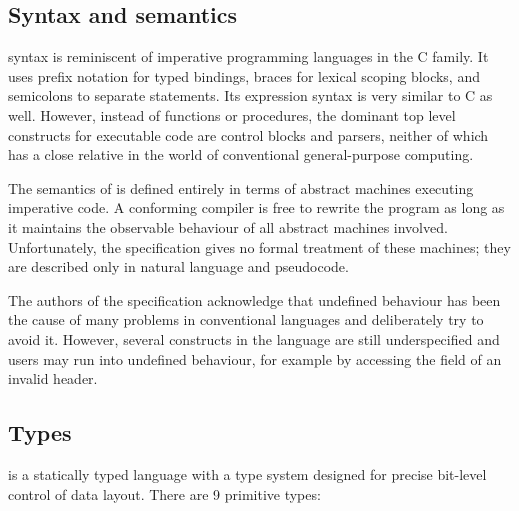 \subsection{Syntax and semantics}



\pfs syntax is reminiscent of imperative programming languages in the C family.
It uses prefix notation for typed bindings, braces for lexical scoping blocks,
and semicolons to separate statements. Its expression syntax is very similar to
C as well. However, instead of functions or procedures, the dominant top level
constructs for executable code are control blocks and parsers, neither of which
has a close relative in the world of conventional general-purpose computing.

The semantics of \pfs is defined entirely in terms of abstract machines
executing imperative code. A conforming compiler is free to rewrite the \pfs
program as long as it maintains the observable behaviour of all abstract
machines involved. Unfortunately, the specification gives no formal treatment
of these machines; they are described only in natural language and pseudocode.

The authors of the specification acknowledge that undefined behaviour has been
the cause of many problems in conventional languages and deliberately try to
avoid it. However, several constructs in the language are still underspecified
and users may run into undefined behaviour, for example by accessing the field
of an invalid header.

\subsection*{Types}

\pfs is a statically typed language with a type system designed for precise
bit-level control of data layout. There are 9 primitive types:


